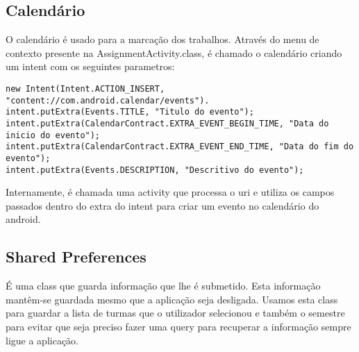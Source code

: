 \documentclass{article}
\begin{document}
\subsection{Calendário}
O calendário é usado para a marcação dos trabalhos. Através do menu de contexto presente na AssignmentActivity.class, é chamado o calendário criando um intent com os seguintes parametros:

\begin{lstlisting}
new Intent(Intent.ACTION_INSERT, "content://com.android.calendar/events").
intent.putExtra(Events.TITLE, "Titulo do evento");
intent.putExtra(CalendarContract.EXTRA_EVENT_BEGIN_TIME, "Data do inicio do evento");
intent.putExtra(CalendarContract.EXTRA_EVENT_END_TIME, "Data do fim do evento");
intent.putExtra(Events.DESCRIPTION, "Descritivo do evento");
\end{lstlisting}
Internamente, é chamada uma activity que processa o uri e utiliza os campos passados dentro do extra do intent para criar um evento no calendário do android.

\subsection{Shared Preferences}
É uma class que guarda informação que lhe é submetido. Esta informação mantêm-se guardada mesmo que a aplicação seja desligada. Usamos esta class para guardar  a lista de turmas que o utilizador selecionou
e também o semestre para evitar que seja preciso fazer uma query para recuperar a informação sempre ligue a aplicação.
\end{document}
